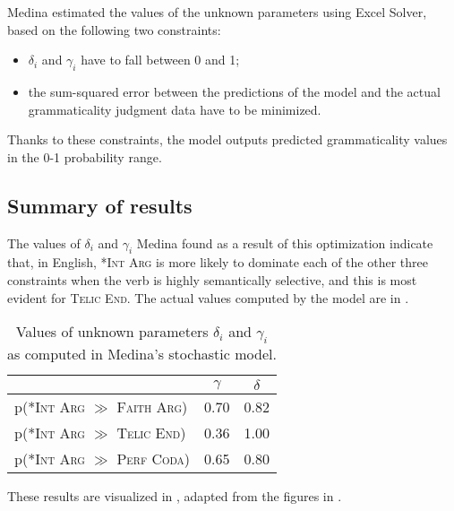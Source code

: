 Medina estimated the values of the unknown parameters using Excel Solver, based on the following two constraints: 
\begin{itemize}
    \item $\delta_i$ and $\gamma_i$ have to fall between 0 and 1;
    \item the sum-squared error between the predictions of the model and the actual grammaticality judgment data have to be minimized.
\end{itemize}
Thanks to these constraints, the model outputs predicted grammaticality values in the 0-1 probability range.

\subsection{Summary of results} 
The values of $\delta_i$ and $\gamma_i$ Medina found as a result of this optimization indicate that, in English, \textsc{*Int Arg} is more likely to dominate each of the other three constraints when the verb is highly semantically selective, and this is most evident for \textsc{Telic End}. The actual values computed by the model are in .

\begin{table}[htb] %
\caption{Values of unknown parameters $\delta_i$ and $\gamma_i$ as computed in Medina's stochastic model.}
\begin{tabular}{l|cc}
                                                                                & $\gamma$ & $\delta$ \\
                                                                                \hline
p(\textsc{*Int Arg} $\gg$ \textsc{Faith Arg}) & 0.70        & 0.82        \\
p(\textsc{*Int Arg} $\gg$ \textsc{Telic End}) & 0.36        & 1.00        \\
p(\textsc{*Int Arg} $\gg$ \textsc{Perf Coda}) & 0.65        & 0.80       
\end{tabular}
\end{table}

These results are visualized in , adapted from the figures in \textcite[143-144]{Medina2007}.

